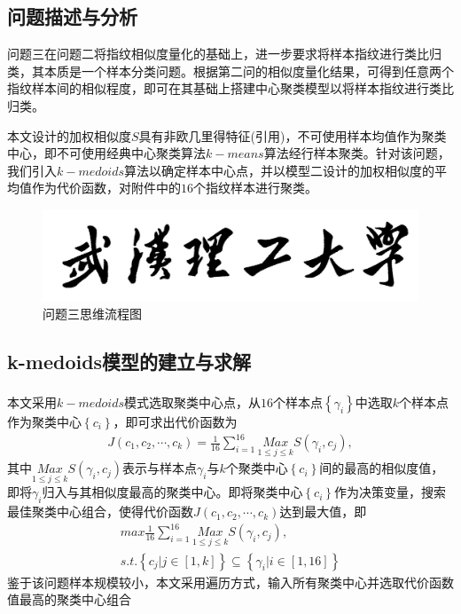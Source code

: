 \documentclass{whutmod}
\newcommand{\upcite}[1]{\textsuperscript{\cite{#1}}}
\begin{document}
  	\subsection{问题描述与分析}
  	问题三在问题二将指纹相似度量化的基础上，进一步要求将样本指纹进行类比归类，其本质是一个样本分类问题。根据第二问的相似度量化结果，可得到任意两个指纹样本间的相似程度，即可在其基础上搭建中心聚类模型以将样本指纹进行类比归类。
  	
    本文设计的加权相似度$S$具有非欧几里得特征(引用)，不可使用样本均值作为聚类中心，即不可使用经典中心聚类算法$k-means$算法经行样本聚类。针对该问题，我们引入$k-medoids$算法以确定样本中心点，并以模型二设计的加权相似度的平均值作为代价函数，对附件中的$16$个指纹样本进行聚类。
  	
  	\begin{figure}[H]
  		\centering
  		\includegraphics[width=\textwidth]{figures/whut.jpg}
  		\caption{问题三思维流程图}\label{lsssscst}
  	\end{figure}
  	\subsection{k-medoids模型的建立与求解}
  	本文采用$k-medoids$模式选取聚类中心点\upcite{14,15}，从$16$个样本点$\left \{ \gamma_i  \right \}$中选取$k$个样本点作为聚类中心$\left \{ c_i \right \}$，即可求出代价函数为
  	\begin{gather}
  J(c_1,c_2,\cdots,c_k)=\frac{1}{16}\sum _{i=1}^{16}\underset{1\leqslant j\leqslant k}{Max}S(\gamma _i,c_j),
  	\end{gather}
  	其中$\underset{1\leqslant j\leqslant k}{Max}S(\gamma _i,c_j)$表示与样本点$ \gamma_i $与$k$个聚类中心$\left \{ c_i \right \}$间的最高的相似度值，即将$\gamma _i$归入与其相似度最高的聚类中心。即将聚类中心$\left \{ c_i \right \}$作为决策变量，搜索最佳聚类中心组合，使得代价函数$J(c_1,c_2,\cdots,c_k)$达到最大值，即
      	\begin{gather}
      max \frac{1}{16}\sum _{i=1}^{16}\underset{1\leqslant j\leqslant k}{Max}S(\gamma _i,c_j),\\
      s.t.\left \{  c_j  | j\in [1,k] \right \}  \subseteq  \left \{ \gamma _i | i\in [1,16]\right \} 
      \end{gather}
  	鉴于该问题样本规模较小，本文采用遍历方式，输入所有聚类中心并选取代价函数值最高的聚类中心组合
\end{document}
